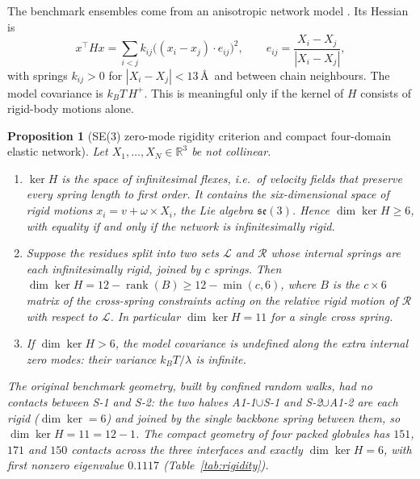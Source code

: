 \documentclass[11pt,reqno]{amsart}
\theoremstyle{plain}
\newtheorem{proposition}[theorem]{Proposition}
\theoremstyle{definition}
\theoremstyle{remark}
\numberwithin{equation}{section}
\begin{document}
The benchmark ensembles come from an anisotropic network model \cite{Tirion1996,Atilgan2001}. Its Hessian is
\begin{equation}\label{eq:anm}
x^{\top}Hx=\sum_{i<j}k_{ij}\bigl((x_i-x_j)\cdot e_{ij}\bigr)^2,\qquad e_{ij}=\frac{X_i-X_j}{|X_i-X_j|},
\end{equation}
with springs $k_{ij}>0$ for $|X_i-X_j|<13$\,\AA\ and between chain neighbours. The model covariance is $k_BT\,H^{+}$. This is meaningful only if the kernel of $H$ consists of rigid-body motions alone.

\begin{proposition}[SE(3) zero-mode rigidity criterion and compact four-domain elastic network]\label{prop:rigidity}
Let $X_1,\dots,X_N\in\mathbb R^3$ be not collinear.
\begin{enumerate}[label=\textup{(\arabic*)},leftmargin=*]
\item $\ker H$ is the space of infinitesimal flexes, i.e.\ of velocity fields that preserve every spring length to first order. It contains the six-dimensional space of rigid motions $x_i=v+\omega\times X_i$, the Lie algebra $\mathfrak{se}(3)$. Hence $\dim\ker H\ge6$, with equality if and only if the network is infinitesimally rigid.
\item Suppose the residues split into two sets $\mathcal L$ and $\mathcal R$ whose internal springs are each infinitesimally rigid, joined by $c$ springs. Then $\dim\ker H=12-\operatorname{rank}(B)\ge12-\min(c,6)$, where $B$ is the $c\times6$ matrix of the cross-spring constraints acting on the relative rigid motion of $\mathcal R$ with respect to $\mathcal L$. In particular $\dim\ker H=11$ for a single cross spring.
\item If $\dim\ker H>6$, the model covariance is undefined along the extra internal zero modes: their variance $k_BT/\lambda$ is infinite.
\end{enumerate}
The original benchmark geometry, built by confined random walks, had no contacts between S-1 and S-2: the two halves A1-1$\cup$S-1 and S-2$\cup$A1-2 are each rigid ($\dim\ker=6$) and joined by the single backbone spring between them, so $\dim\ker H=11=12-1$. The compact geometry of four packed globules has $151$, $171$ and $150$ contacts across the three interfaces and exactly $\dim\ker H=6$, with first nonzero eigenvalue $0.1117$ (Table~\ref{tab:rigidity}).
\end{proposition}
\end{document}
